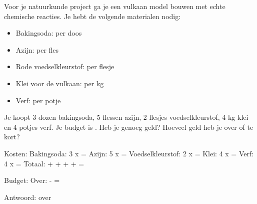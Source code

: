 \begin{opgave}
Voor je natuurkunde project ga je een vulkaan model bouwen met echte chemische
reacties. Je hebt de volgende materialen nodig:

\begin{itemize}
\item Bakingsoda:  per doos
\item Azijn:  per fles
\item Rode voedselkleurstof:  per flesje
\item Klei voor de vulkaan:  per kg
\item Verf:  per potje
\end{itemize}

Je koopt 3 dozen bakingsoda, 5 flessen azijn, 2 flesjes voedselkleurstof, 4 kg klei
en 4 potjes verf. Je budget is . Heb je genoeg geld? Hoeveel geld
heb je over of te kort?
\end{opgave}

\begin{oplossing}
Kosten:
Bakingsoda: 3 x  = 
Azijn: 5 x  = 
Voedselkleurstof: 2 x  = 
Klei: 4 x  = 
Verf: 4 x  = 
Totaal:  +  +  +  +  = 

Budget: 
Over:  -  = 

Antwoord:  over
\end{oplossing}